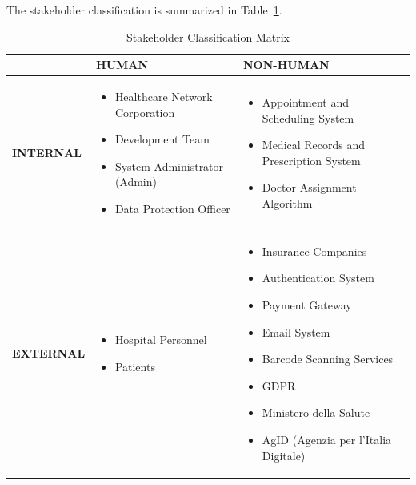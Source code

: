 \documentclass[12pt, a4paper]{article}
\begin{document}
The stakeholder classification is summarized in Table~\ref{tab:stakeholder_matrix}.

\begin{table}[h!]
\centering
\renewcommand{\arraystretch}{1.5}
\begin{tabular}{|l|p{6.5cm}|p{6.5cm}|}
\hline
\rowcolor{gray!30}
& \textbf{HUMAN} & \textbf{NON-HUMAN} \\
\hline

\rowcolor{blue!10}
\textbf{INTERNAL} & 
\vspace{-0.5cm}
\begin{itemize}
    \item Healthcare Network Corporation
    \item Development Team
    \item System Administrator (Admin)
    \item Data Protection Officer
\end{itemize}
\vspace{-0.5cm}
& 
\vspace{-0.5cm}
\begin{itemize}
    \item Appointment and Scheduling System
    \item Medical Records and Prescription System
    \item Doctor Assignment Algorithm
\end{itemize} 
\vspace{-0.5cm} \\
\hline

\rowcolor{green!10}
\textbf{EXTERNAL} & 
\vspace{-0.5cm}
\begin{itemize}
    \item Hospital Personnel
    \item Patients
\end{itemize}
\vspace{-0.5cm}
& 
\vspace{-0.5cm}
\begin{itemize}
    \item Insurance Companies
    \item Authentication System
    \item Payment Gateway
    \item Email System
    \item Barcode Scanning Services
    \item GDPR
    \item Ministero della Salute
    \item AgID (Agenzia per l'Italia Digitale)
\end{itemize}
\vspace{-0.5cm} \\
\hline
\end{tabular}
\caption{Stakeholder Classification Matrix}
\label{tab:stakeholder_matrix}
\end{table}
\end{document}
